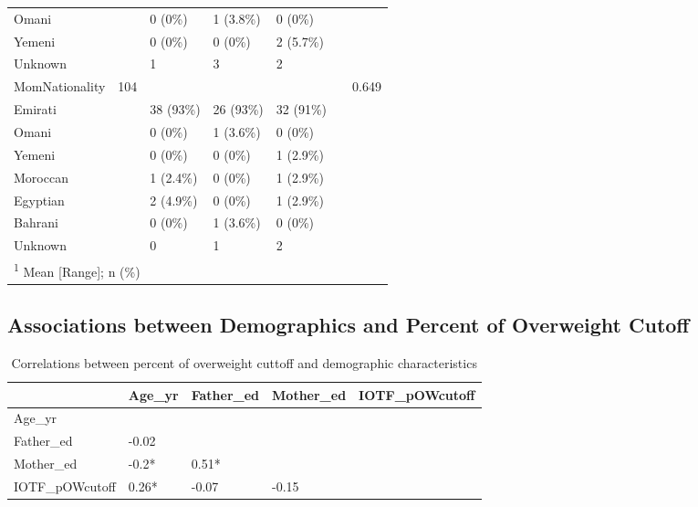 \documentclass[
]{article}
\begin{document}
\begin{table}[!h]
\begin{tabular}[t]{lllllll}
\hspace{1em}Omani &  & 0 (0\%) & 1 (3.8\%) & 0 (0\%) &  & \\
\hspace{1em}Yemeni &  & 0 (0\%) & 0 (0\%) & 2 (5.7\%) &  & \\
\hspace{1em}Unknown &  & 1 & 3 & 2 &  & \\
\addlinespace
MomNationality & 104 &  &  &  &  & 0.649\\
\hspace{1em}Emirati &  & 38 (93\%) & 26 (93\%) & 32 (91\%) &  & \\
\hspace{1em}Omani &  & 0 (0\%) & 1 (3.6\%) & 0 (0\%) &  & \\
\hspace{1em}Yemeni &  & 0 (0\%) & 0 (0\%) & 1 (2.9\%) &  & \\
\hspace{1em}Moroccan &  & 1 (2.4\%) & 0 (0\%) & 1 (2.9\%) &  & \\
\addlinespace
\hspace{1em}Egyptian &  & 2 (4.9\%) & 0 (0\%) & 1 (2.9\%) &  & \\
\hspace{1em}Bahrani &  & 0 (0\%) & 1 (3.6\%) & 0 (0\%) &  & \\
\hspace{1em}Unknown &  & 0 & 1 & 2 &  & \\
\bottomrule
\multicolumn{7}{l}{\rule{0pt}{1em}\textsuperscript{1} Mean [Range]; n (\%)}\\
\end{tabular}
\end{table}
\FloatBarrier

\hypertarget{associations-between-demographics-and-percent-of-overweight-cutoff}{%
\subsection{Associations between Demographics and Percent of Overweight
Cutoff}\label{associations-between-demographics-and-percent-of-overweight-cutoff}}

\begin{table}[!h]

\caption{\label{tab:IOTF_pOWcutoff_demo_cors}Correlations between percent of overweight cuttoff and demographic characteristics}
\centering
\begin{tabular}[t]{lllll}
\toprule
  & Age\_yr & Father\_ed & Mother\_ed & IOTF\_pOWcutoff\\
\midrule
Age\_yr &  &  &  & \\
Father\_ed & -0.02 &  &  & \\
Mother\_ed & -0.2* & 0.51* &  & \\
IOTF\_pOWcutoff & 0.26* & -0.07 & -0.15 & \\
\bottomrule
\end{tabular}
\end{table}
\end{document}
